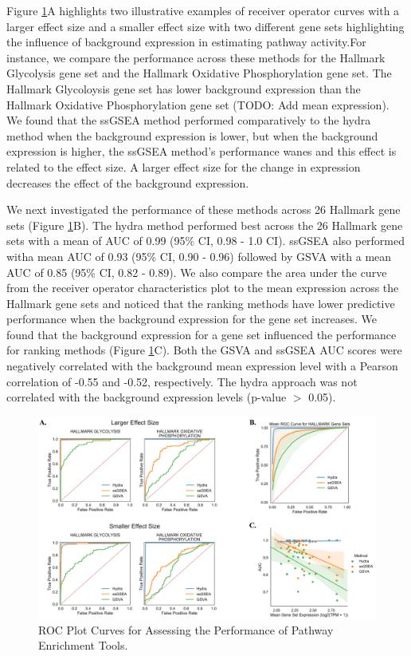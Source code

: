 \documentclass[fleqn,10pt]{wlscirep}
\begin{document}
Figure \ref{sfig:rocplot}A highlights two illustrative examples of receiver operator curves with a larger effect size and a smaller effect size with two different gene sets highlighting the influence of background expression in estimating pathway activity.For instance, we compare the performance across these methods for the Hallmark Glycolysis gene set and the Hallmark Oxidative Phosphorylation gene set. The Hallmark Glycoloysis gene set has lower background expression than the Hallmark Oxidative Phosphorylation gene set (TODO: Add mean expression). We found that the ssGSEA method performed comparatively to the hydra method when the background expression is lower, but when the background expression is higher, the ssGSEA method's performance wanes and this effect is related to the effect size. A larger effect size for the change in expression decreases the effect of the background expression.

We next investigated the performance of these methods across 26 Hallmark gene sets (Figure \ref{sfig:rocplot}B). The hydra method performed best across the 26 Hallmark gene sets with a mean of AUC of 0.99 (95\% CI, 0.98 - 1.0 CI). ssGSEA also performed witha mean AUC of 0.93 (95\% CI, 0.90 - 0.96) followed by GSVA with a mean AUC of 0.85 (95\% CI, 0.82 - 0.89).  We also compare the area under the curve from the receiver operator characteristics plot to the mean expression across the Hallmark gene sets and noticed that the ranking methods have lower predictive performance when the background expression for the gene set increases. We found that the background expression for a gene set influenced the performance for ranking methods (Figure \ref{sfig:rocplot}C). Both the GSVA and ssGSEA AUC scores were negatively correlated with the background mean expression level with a Pearson correlation of -0.55 and -0.52, respectively. The hydra approach was not correlated with the background expression levels (p-value $>$ 0.05).


\begin{figure}
	\centering
	\includegraphics[width=0.8\linewidth]{images/figure-2-roc-curves@2x.png}
	\caption{ROC Plot Curves for Assessing the Performance of Pathway Enrichment Tools.}
	\label{sfig:rocplot}
\end{figure}
\end{document}
